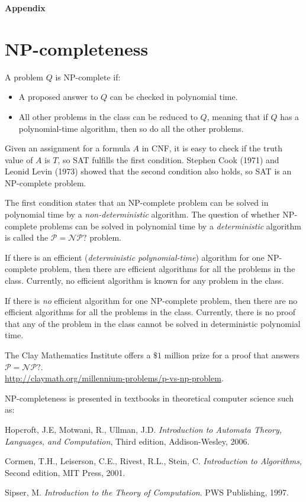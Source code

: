 \documentclass[11pt,a4paper]{article}
\begin{document}
\newpage

\textbf{\Large Appendix}

\appendix

\section{NP-completeness}

A problem $Q$ is NP-complete if:
\begin{itemize}
\item A proposed answer to $Q$ can be checked in polynomial time.
\item All other problems in the class can be reduced to $Q$, meaning that if $Q$ has a polynomial-time algorithm, then so do all the other problems.
\end{itemize}
Given an assignment for a formula $A$ in CNF, it is easy to check if the truth value of $A$ is $T$, so SAT fulfills the first condition. Stephen Cook (1971) and Leonid Levin (1973) showed that the second condition also holds, so SAT is an NP-complete problem.

The first condition states that an NP-complete problem can be solved in polynomial time by a \emph{non-deterministic} algorithm. The question of whether NP-complete problems can be solved in polynomial time by a \emph{deterministic} algorithm is called the $\mathcal{P}=\mathcal{NP}?$ problem.

If there is an efficient (\emph{deterministic polynomial-time}) algorithm for one NP-complete problem, then there are efficient algorithms for all the problems in the class. Currently, no efficient algorithm is known for any problem in the class.

If there is \emph{no} efficient algorithm for one NP-complete problem, then there are no efficient algorithms for all the problems in the class. Currently, there is no proof that any of the problem in the class cannot be solved in deterministic polynomial time.

The Clay Mathematics Institute offers a $\$1$ million prize for a proof that answers $\mathcal{P}=\mathcal{NP}?$.\\ \url{http://claymath.org/millennium-problems/p-vs-np-problem}.

NP-completeness is presented in textbooks in theoretical computer science such as:

Hopcroft, J.E, Motwani, R., Ullman, J.D. \textit{Introduction to Automata Theory, Languages, and Computation}, Third edition,  Addison-Wesley, 2006.

Cormen, T.H., Leiserson, C.E., Rivest, R.L., Stein, C. \textit{Introduction to Algorithms}, Second edition, MIT Press, 2001.

Sipser, M. \textit{Introduction to the Theory of Computation}. PWS Publishing, 1997.
\end{document}
